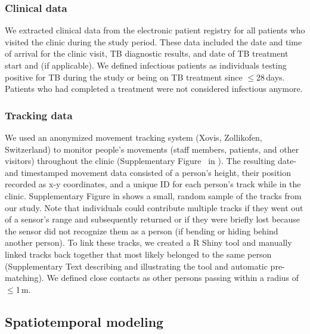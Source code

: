\documentclass[fleqn,11pt]{wlscirep}
\begin{document}
\subsubsection{Clinical data}

We extracted clinical data from the electronic patient registry for all patients who visited the clinic during the study period. These data included the date and time of arrival for the clinic visit, TB diagnostic results, and date of TB treatment start and (if applicable). We defined infectious patients as individuals testing positive for TB during the study or being on TB treatment since $\leq$28\,days. Patients who had completed a treatment were not considered infectious anymore.

\subsubsection{Tracking data}

We used an anonymized movement tracking system (Xovis, Zollikofen, Switzerland) to monitor people’s movements (staff members, patients, and other visitors) throughout the clinic (Supplementary Figure~ in \supp). The resulting date- and timestamped movement data consisted of a person’s height, their position recorded as x-y coordinates, and a unique ID for each person's track while in the clinic. Supplementary Figure  in \supp shows a small, random sample of the tracks from our study. Note that individuals could contribute multiple tracks if they went out of a sensor’s range and subsequently returned or if they were briefly lost because the sensor did not recognize them as a person (\eg if bending or hiding behind another person). To link these tracks, we created a R Shiny tool and manually linked tracks back together that most likely belonged to the same person (Supplementary Text describing and illustrating the tool and automatic pre-matching). We defined close contacts as other persons passing within a radius of $\leq$1\,m. 


\subsection{Spatiotemporal modeling}
\end{document}
